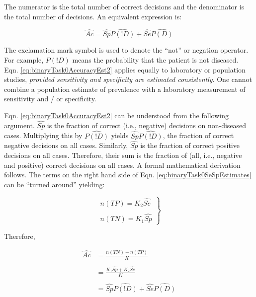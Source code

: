 \documentclass[
]{book}
\begin{document}
The numerator is the total number of correct decisions and the denominator is the total number of decisions. An equivalent expression is:

\begin{equation} 
\widehat{Ac}=\widehat{Sp}\widehat{P(!D)}+\widehat{Se}\widehat{P(D)}
\label{eq:binaryTask0AccuracyEst2}
\end{equation}

The exclamation mark symbol is used to denote the ``not'' or negation operator. For example, \(P(!D)\) means the probability that the patient is not diseased. Eqn. \eqref{eq:binaryTask0AccuracyEst2} applies equally to laboratory or population studies, \emph{provided sensitivity and specificity are estimated consistently}. One cannot combine a population estimate of prevalence with a laboratory measurement of sensitivity and / or specificity.

Eqn. \eqref{eq:binaryTask0AccuracyEst2} can be understood from the following argument. \(\widehat{Sp}\) is the fraction of correct (i.e., negative) decisions on non-diseased cases. Multiplying this by \(\widehat{P(!D)}\) yields \(\widehat{Sp} \widehat{P(!D)}\), the fraction of correct negative decisions on all cases. Similarly, \(\widehat{Sp}\) is the fraction of correct positive decisions on all cases. Therefore, their sum is the fraction of (all, i.e., negative and positive) correct decisions on all cases. A formal mathematical derivation follows. The terms on the right hand side of Eqn. \eqref{eq:binaryTask0SeSpEstimates} can be ``turned around'' yielding:

\begin{equation} 
\left.\begin{matrix}
n(TP)=K_2 \widehat{Se}\\ 
\\
n(TN)=K_1 \widehat{Sp}
\end{matrix}\right\}
\label{eq:binaryTask0nTpnTN}
\end{equation}

Therefore,

\begin{equation} 
\begin{aligned}
\widehat{Ac}&=\frac{n(TN)+n(TP)}{K}\\
\\
&=\frac{K_1 \widehat{Sp}+K_2 \widehat{Se}}{K}\\
\\
&=\widehat{Sp} \widehat{P(!D)}+\widehat{Se}\widehat{P(D)}
\end{aligned}
\label{eq:binaryTask0AccuracyDeriv}
\end{equation}
\end{document}
